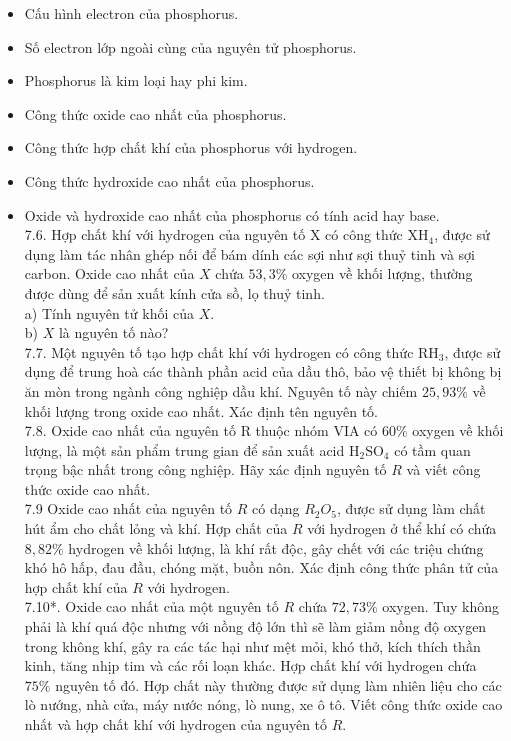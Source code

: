 \documentclass[10pt]{article}
\begin{document}
\begin{itemize}
  \item Cấu hình electron của phosphorus.
  \item Số electron lớp ngoài cùng của nguyên tử phosphorus.
  \item Phosphorus là kim loại hay phi kim.
  \item Công thức oxide cao nhất của phosphorus.
  \item Công thức hợp chất khí của phosphorus với hydrogen.
  \item Công thức hydroxide cao nhất của phosphorus.
  \item Oxide và hydroxide cao nhất của phosphorus có tính acid hay base.\\
7.6. Hợp chất khí với hydrogen của nguyên tố X có công thức $\mathrm{XH}_{4}$, được sử dụng làm tác nhân ghép nối để bám dính các sợi như sợi thuỷ tinh và sợi carbon. Oxide cao nhất của $X$ chứa $53,3 \%$ oxygen về khối lượng, thường được dùng để sản xuất kính cửa sồ, lọ thuỷ tinh.\\
a) Tính nguyên tử khối của $X$.\\
b) $X$ là nguyên tố nào?\\
7.7. Một nguyên tố tạo hợp chất khí với hydrogen có công thức $\mathrm{RH}_{3}$, được sử dụng để trung hoà các thành phần acid của dầu thô, bảo vệ thiết bị không bị ăn mòn trong ngành công nghiệp dầu khí. Nguyên tố này chiếm $25,93 \%$ về khối lượng trong oxide cao nhất. Xác định tên nguyên tố.\\
7.8. Oxide cao nhất của nguyên tố R thuộc nhóm VIA có $60 \%$ oxygen về khối lượng, là một sản phẩm trung gian để sản xuất acid $\mathrm{H}_{2} \mathrm{SO}_{4}$ có tầm quan trọng bậc nhất trong công nghiệp. Hãy xác định nguyên tố $R$ và viết công thức oxide cao nhất.\\
7.9 Oxide cao nhất của nguyên tố $R$ có dạng $R_{2} O_{5}$, được sử dụng làm chất hút ẩm cho chất lỏng và khí. Hợp chất của $R$ với hydrogen ở thể khí có chứa $8,82 \%$ hydrogen về khối lượng, là khí rất độc, gây chết với các triệu chứng khó hô hấp, đau đầu, chóng mặt, buồn nôn. Xác định công thức phân tử của hợp chất khí của $R$ với hydrogen.\\
7.10*. Oxide cao nhất của một nguyên tố $R$ chứa $72,73 \%$ oxygen. Tuy không phải là khí quá độc nhưng với nồng độ lớn thì sẽ làm giảm nồng độ oxygen trong không khí, gây ra các tác hại như mệt mỏi, khó thở, kích thích thần kinh, tăng nhịp tim và các rối loạn khác. Hợp chất khí với hydrogen chứa $75 \%$ nguyên tố đó. Hợp chất này thường được sử dụng làm nhiên liệu cho các lò nướng, nhà cửa, máy nước nóng, lò nung, xe ô tô. Viết công thức oxide cao nhất và hợp chất khí với hydrogen của nguyên tố $R$.
\end{itemize}
\end{document}
